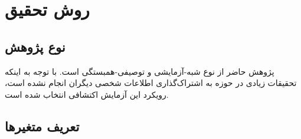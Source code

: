 \chapter{روش تحقیق}
\section{نوع پژوهش}
پژوهش حاضر از نوع شبه-آزمایشی و توصیفی-همبستگی است. با توجه به اینکه تحقیقات زیادی در حوزه به اشتراک‌گذاری اطلاعات شخصی دیگران 
انجام نشده است، رویکرد این آزمایش اکتشافی انتخاب شده است.
\section{تعریف متغیر‌ها}


